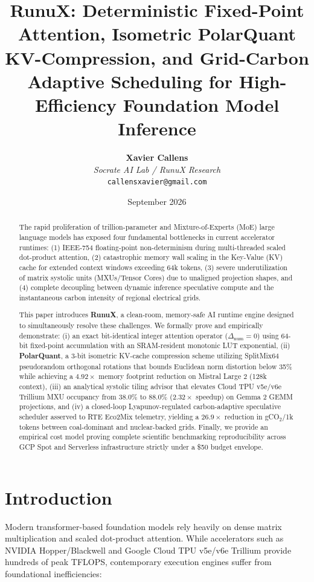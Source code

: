 \documentclass[10pt,twocolumn]{article}
\title{\textbf{RunuX: Deterministic Fixed-Point Attention, Isometric PolarQuant KV-Compression, and Grid-Carbon Adaptive Scheduling for High-Efficiency Foundation Model Inference}}
\author{
    \textbf{Xavier Callens} \\
    \textit{Socrate AI Lab / RunuX Research} \\
    \texttt{callensxavier@gmail.com}
}
\date{September 2026}
\begin{document}
\maketitle

\begin{abstract}
The rapid proliferation of trillion-parameter and Mixture-of-Experts (MoE) large language models has exposed four fundamental bottlenecks in current accelerator runtimes: (1) IEEE-754 floating-point non-determinism during multi-threaded scaled dot-product attention, (2) catastrophic memory wall scaling in the Key-Value (KV) cache for extended context windows exceeding 64k tokens, (3) severe underutilization of matrix systolic units (MXUs/Tensor Cores) due to unaligned projection shapes, and (4) complete decoupling between dynamic inference speculative compute and the instantaneous carbon intensity of regional electrical grids. 

This paper introduces \textbf{RunuX}, a clean-room, memory-safe AI runtime engine designed to simultaneously resolve these challenges. We formally prove and empirically demonstrate: (i) an exact bit-identical integer attention operator ($\Delta_{\mathrm{num}} = 0$) using 64-bit fixed-point accumulation with an SRAM-resident monotonic LUT exponential, (ii) \textbf{PolarQuant}, a 3-bit isometric KV-cache compression scheme utilizing SplitMix64 pseudorandom orthogonal rotations that bounds Euclidean norm distortion below 35\% while achieving a $4.92\times$ memory footprint reduction on Mistral Large 2 (128k context), (iii) an analytical systolic tiling advisor that elevates Cloud TPU v5e/v6e Trillium MXU occupancy from 38.0\% to 88.0\% ($2.32\times$ speedup) on Gemma 2 GEMM projections, and (iv) a closed-loop Lyapunov-regulated carbon-adaptive speculative scheduler asserved to RTE Eco2Mix telemetry, yielding a $26.9\times$ reduction in gCO$_2$/1k tokens between coal-dominant and nuclear-backed grids. Finally, we provide an empirical cost model proving complete scientific benchmarking reproducibility across GCP Spot and Serverless infrastructure strictly under a \$50 budget envelope.
\end{abstract}

\section{Introduction}

Modern transformer-based foundation models \cite{vaswani2017attention} rely heavily on dense matrix multiplication and scaled dot-product attention. While accelerators such as NVIDIA Hopper/Blackwell and Google Cloud TPU v5e/v6e Trillium provide hundreds of peak TFLOPS, contemporary execution engines suffer from foundational inefficiencies:
\end{document}
